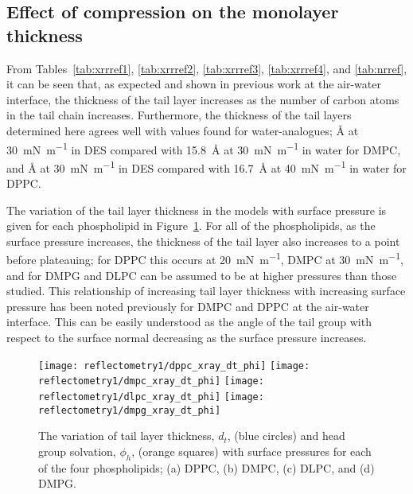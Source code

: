 %

\subsection{Effect of compression on the monolayer thickness}
From Tables~\ref{tab:xrrref1}, \ref{tab:xrrref2}, \ref{tab:xrrref3}, \ref{tab:xrrref4}, and \ref{tab:nrref}, it can be seen that, as expected and shown in previous work at the air-water interface,\autocite{mohwald_phospholipid_1990,vaknin_structural_1991} the thickness of the tail layer increases as the number of carbon atoms in the tail chain increases.
Furthermore, the thickness of the tail layers determined here agrees well with values found for water-analogues; \si{\angstrom} at \SI{30}{\milli\newton\per\meter} in DES compared with \SI{15.8}{\angstrom} at \SI{30}{\milli\newton\per\meter} in water for DMPC, and \si{\angstrom} at \SI{30}{\milli\newton\per\meter} in DES compared with \SI{16.7}{\angstrom} at \SI{40}{\milli\newton\per\meter} in water for DPPC.

The variation of the tail layer thickness in the models with surface pressure is given for each phospholipid in Figure~\ref{fig:dtphi}.
For all of the phospholipids, as the surface pressure increases, the thickness of the tail layer also increases to a point before plateauing; for DPPC this occurs at \SI{20}{\milli\newton\per\meter}, DMPC at \SI{30}{\milli\newton\per\meter}, and for DMPG and DLPC can be assumed to be at higher pressures than those studied.
This relationship of increasing tail layer thickness with increasing surface pressure has been noted previously for DMPC\autocite{bayerl_specular_1990} and DPPC\autocite{campbell_structure_2018} at the air-water interface.
This can be easily understood as the angle of the tail group with respect to the surface normal decreasing as the surface pressure increases.
%
\begin{figure}
    \centering
    \texttt{[image: reflectometry1/dppc\_xray\_dt\_phi]}
    \texttt{[image: reflectometry1/dmpc\_xray\_dt\_phi]}
    \texttt{[image: reflectometry1/dlpc\_xray\_dt\_phi]}
    \texttt{[image: reflectometry1/dmpg\_xray\_dt\_phi]}
    \caption{The variation of tail layer thickness, $d_t$, (blue circles) and head group solvation, $\phi_h$, (orange squares) with surface pressures for each of the four phospholipids; (a) DPPC, (b) DMPC, (c) DLPC, and (d) DMPG.}
    \label{fig:dtphi}
\end{figure}
%

